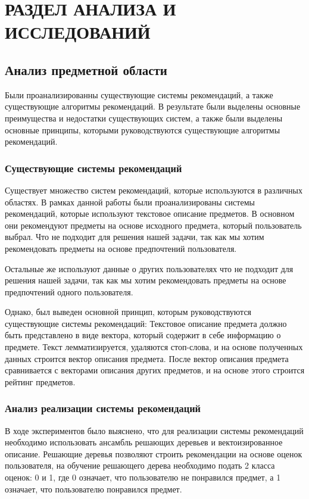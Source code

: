 \graphicspath{{./img}}
\chapter{РАЗДЕЛ АНАЛИЗА И ИССЛЕДОВАНИЙ}
\section{Анализ предметной области}
Были проанализированны существующие системы рекомендаций, а также существующие алгоритмы рекомендаций.
В результате были выделены основные преимущества и недостатки существующих систем,
а также были выделены основные принципы, которыми руководствуются существующие алгоритмы рекомендаций.

\subsection{Существующие системы рекомендаций}
Существует множество систем рекомендаций, которые используются в различных областях.
В рамках данной работы были проанализированы системы рекомендаций, которые используют текстовое описание предметов.
В основном они рекомендуют предметы на основе исходного предмета, который пользователь выбрал.
Что не подходит для решения нашей задачи, так как мы хотим рекомендовать предметы на основе предпочтений пользователя.

Остальные же используют данные о других пользователях что не подходит для решения нашей задачи, так как мы хотим
рекомендовать предметы на основе предпочтений одного пользователя.

Однако, был выведен основной принцип, которым руководствуются существующие системы рекомендаций:
Текстовое описание предмета должно быть представлено в виде вектора, который содержит в себе информацию о предмете.
Текст лемматизируется, удаляются стоп-слова, и на основе полученных данных строится вектор описания предмета.
После вектор описания предмета сравнивается с векторами описания других предметов, и на основе этого строится
рейтинг предметов.

\subsection{Анализ реализации системы рекомендаций}
В ходе экспериментов было выяснено, что для реализации системы рекомендаций необходимо использовать ансамбль
решающих деревьев и вектоизированное описание.
Решающие деревья позволяют строить рекомендации на основе оценок пользователя, на обучение решающего дерева
необходимо подать 2 класса оценок: 0 и 1, где 0 означает, что пользователю не понравился предмет, а 1 означает,
что пользователю понравился предмет.

